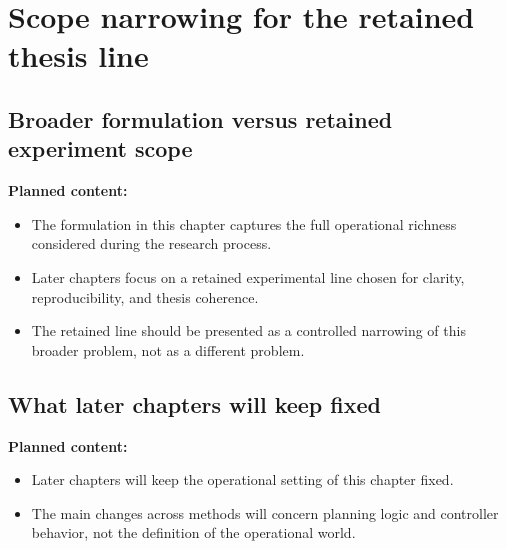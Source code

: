 \section{Scope narrowing for the retained thesis line}
\label{sec:chapter03_scope_narrowing}

%

\subsection{Broader formulation versus retained experiment scope}
\label{subsec:chapter03_broader_vs_retained_scope}


\noindent\textbf{Planned content:}
\begin{itemize}
    \item The formulation in this chapter captures the full operational richness considered during the research process.
    \item Later chapters focus on a retained experimental line chosen for clarity, reproducibility, and thesis coherence.
    \item The retained line should be presented as a controlled narrowing of this broader problem, not as a different problem.
\end{itemize}

\subsection{What later chapters will keep fixed}
\label{subsec:chapter03_later_fixed_elements}

%

\noindent\textbf{Planned content:}
\begin{itemize}
    \item Later chapters will keep the operational setting of this chapter fixed.
    \item The main changes across methods will concern planning logic and controller behavior, not the definition of the operational world.
\end{itemize}

